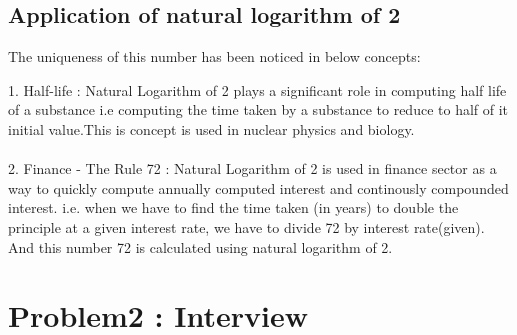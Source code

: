 \documentclass[12pt]{article}
\begin{document}
\subsection*{Application of natural logarithm of 2}
The uniqueness of this number has been noticed in below concepts:

1. Half-life : Natural Logarithm of 2 plays a significant role in computing half life of a substance i.e computing the time taken by a substance to reduce to half of it initial value.This is concept is used in nuclear physics and biology.\\\\
2. Finance - The Rule 72 : Natural Logarithm of 2 is used in finance sector as a way to quickly compute annually computed interest and continously compounded interest.  i.e. when we have to find the time taken (in years) to double the principle at a given interest rate, we have to divide 72 by interest rate(given). And this number 72 is calculated using natural logarithm of 2.

\section{Problem2 : Interview}
\end{document}
